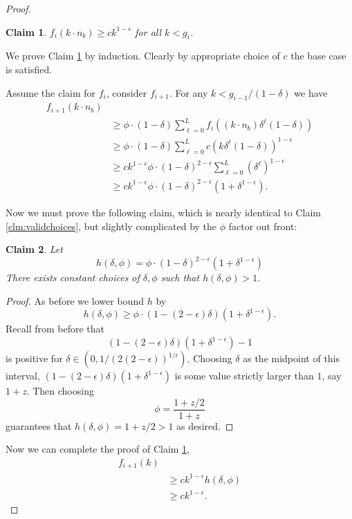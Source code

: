 \documentclass[twocolumn]{article}[10pt]
\newtheorem{clm}{Claim}
\begin{document}
\begin{proof}
  \begin{clm}
    \label{clm:fikinductionagain}
    $f_i(k \cdot n_b) \ge ck^{1-\epsilon}$ for all $k < g_i$.
  \end{clm}
  We prove Claim \ref{clm:fikinductionagain} by induction. Clearly by
  appropriate choice of $c$ the base case is satisfied.

  Assume the claim for $f_i$, consider $f_{i+1}$. For any $k < g_{i-1}/(1-\delta)$ we have
  \begin{align*}
    f_{i+1}(k\cdot n_b) & \\
                  &\ge \phi\cdot(1-\delta)\sum_{\ell=0}^L f_i((k\cdot n_b)\delta^\ell (1-\delta))\\
                  &\ge \phi\cdot(1-\delta)\sum_{\ell=0}^L c (k\delta^\ell(1-\delta))^{1-\epsilon}\\
                  &\ge ck^{1-\epsilon} \phi\cdot(1-\delta)^{2-\epsilon}\sum_{\ell=0}^L (\delta^\ell)^{1-\epsilon}\\
                  &\ge ck^{1-\epsilon} \phi\cdot(1-\delta)^{2-\epsilon}( 1+\delta^{1-\epsilon}).
  \end{align*}

  Now we must prove the following claim, which is nearly identical to Claim
  \ref{clm:validchoices}, but slightly complicated by the $\phi$ factor out front:
  \begin{clm}
    Let 
    $$h(\delta, \phi) = \phi\cdot (1-\delta)^{2-\epsilon}(1+\delta^{1-\epsilon})$$
    There exists constant choices of $\delta, \phi$ such that $h(\delta, \phi) > 1$.
  \end{clm}
  \begin{proof}
    As before we lower bound $h$ by 
    $$h(\delta, \phi) \ge \phi \cdot (1-(2-\epsilon)\delta)(1+\delta^{1-\epsilon}).$$
    Recall from before that 
    $$(1-(2-\epsilon)\delta)(1+\delta^{1-\epsilon}) -1$$ is positive for
    $\delta \in (0, 1/(2(2-\epsilon))^{1/\epsilon})$. Choosing $\delta$ as the
    midpoint of this interval, $(1-(2-\epsilon)\delta)(1+\delta^{1-\epsilon})$
    is some value strictly larger than $1$, say $1+z$. Then
    choosing $$\phi = \frac{1+z/2}{1+z}$$
    guarantees that $h(\delta, \phi) = 1+z/2 > 1$ as desired.
  \end{proof}

  Now we can complete the proof of Claim \ref{clm:fikinductionagain}, 
  \begin{align*}
    f_{i+1}(k) & \\
               &\ge ck^{1-\epsilon} h(\delta, \phi)\\
               &\ge ck^{1-\epsilon}.
  \end{align*}


\end{proof}
\end{document}
